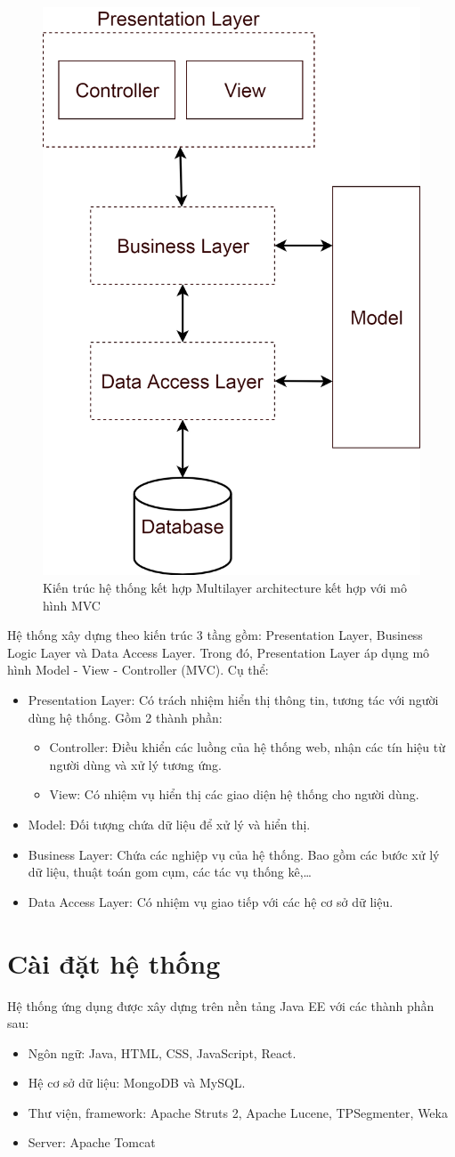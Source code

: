 	\begin{figure}[H]
		\centering
		\includegraphics[width=0.5\linewidth]{Chapter3/Chapter3Figs/Layers}
		\caption{Kiến trúc hệ thống kết hợp Multilayer architecture kết hợp với mô hình MVC}
		\label{fig:layers}
	\end{figure}
Hệ thống xây dựng theo kiến trúc 3 tầng gồm: Presentation Layer, Business Logic Layer và Data Access Layer. Trong đó, Presentation Layer áp dụng mô hình Model - View - Controller (MVC). Cụ thể:
	\begin{itemize}
		\item Presentation Layer: Có trách nhiệm hiển thị thông tin, tương tác với người dùng hệ thống. Gồm 2 thành phần:
			\begin{itemize}
				\item Controller: Điều khiển các luồng của hệ thống web, nhận các tín hiệu từ người dùng và xử lý tương ứng.
				\item View: Có nhiệm vụ hiển thị các giao diện hệ thống cho người dùng.
			\end{itemize}
		\item Model: Đối tượng chứa dữ liệu để xử lý và hiển thị.
		\item Business Layer: Chứa các nghiệp vụ của hệ thống. Bao gồm các bước xử lý dữ liệu, thuật toán gom cụm, các tác vụ thống kê,…
		\item Data Access Layer: Có nhiệm vụ giao tiếp với các hệ cơ sở dữ liệu.
	\end{itemize}

\section{Cài đặt hệ thống}%
Hệ thống ứng dụng được xây dựng trên nền tảng Java EE với các thành phần sau:
	\begin{itemize}
		\item Ngôn ngữ: Java, HTML, CSS, JavaScript, React.
		\item Hệ cơ sở dữ liệu: MongoDB và MySQL.
		\item Thư viện, framework: Apache Struts 2, Apache Lucene, TPSegmenter, Weka
		\item Server: Apache Tomcat
	\end{itemize}

